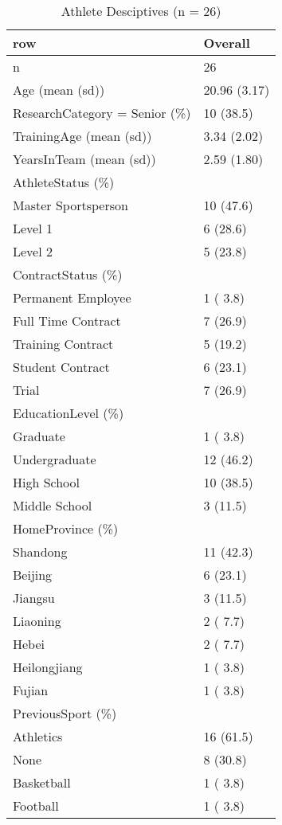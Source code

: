 \begin{table}[ht]
\centering
\begin{tabular}{ll}
  \hline
row & Overall \\ 
  \hline
n &    26 \\ 
  Age (mean (sd)) & 20.96 (3.17) \\ 
  ResearchCategory = Senior (\%) &    10 (38.5)  \\ 
  TrainingAge (mean (sd)) &  3.34 (2.02) \\ 
  YearsInTeam (mean (sd)) &  2.59 (1.80) \\ 
  AthleteStatus (\%) &     \\ 
     Master Sportsperson &    10 (47.6)  \\ 
     Level 1 &     6 (28.6)  \\ 
     Level 2 &     5 (23.8)  \\ 
  ContractStatus (\%) &     \\ 
     Permanent Employee &     1 ( 3.8)  \\ 
     Full Time Contract &     7 (26.9)  \\ 
     Training Contract &     5 (19.2)  \\ 
     Student Contract &     6 (23.1)  \\ 
     Trial &     7 (26.9)  \\ 
  EducationLevel (\%) &     \\ 
     Graduate &     1 ( 3.8)  \\ 
     Undergraduate &    12 (46.2)  \\ 
     High School &    10 (38.5)  \\ 
     Middle School &     3 (11.5)  \\ 
  HomeProvince (\%) &     \\ 
     Shandong &    11 (42.3)  \\ 
     Beijing &     6 (23.1)  \\ 
     Jiangsu &     3 (11.5)  \\ 
     Liaoning &     2 ( 7.7)  \\ 
     Hebei &     2 ( 7.7)  \\ 
     Heilongjiang &     1 ( 3.8)  \\ 
     Fujian &     1 ( 3.8)  \\ 
  PreviousSport (\%) &     \\ 
     Athletics &    16 (61.5)  \\ 
     None &     8 (30.8)  \\ 
     Basketball &     1 ( 3.8)  \\ 
     Football &     1 ( 3.8)  \\ 
   \hline
\end{tabular}
\caption{Athlete Desciptives (n = 26)} 
\label{tab:ethnoDescriptivesTable}
\end{table}
